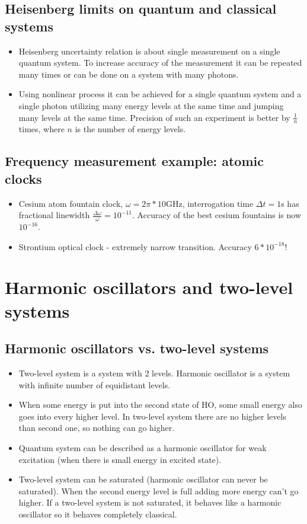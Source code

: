 \documentclass[AtomicOptical1Notes.tex]{subfiles}
\begin{document}
	\subsection{Heisenberg limits on quantum and classical systems}
		\begin{itemize}
			\item Heisenberg uncertainty relation is about single measurement on a single quantum system. To increase accuracy of the measurement it can be repeated many times or can be done on a system with many photons.
			\item Using nonlinear process it can be achieved for a single quantum system and a single photon utilizing many energy levels at the same time and jumping many levels at the same time. Precision of such an experiment is better by $\frac{1}{n}$ times, where $n$ is the number of energy levels.
		\end{itemize}
	\subsection{Frequency measurement example: atomic clocks}
		\begin{itemize}
			\item Cesium atom fountain clock, $\omega=2\pi*10$GHz, interrogation time $\Delta t=1$s has fractional linewidth $\frac{\Delta\omega}{\omega}=10^{-11}$. Accuracy of the best cesium fountains is now $10^{-16}$.
			\item Strontium optical clock - extremely narrow transition. Accuracy $6*10^{-18}$!
		\end{itemize}
		
\section{Harmonic oscillators and two-level systems}
	\subsection{Harmonic oscillators vs. two-level systems}
		\begin{itemize}
			\item Two-level system is a system with 2 levels. Harmonic oscillator is a system with infinite number of equidistant levels. 
			\item When some energy is put into the second state of HO, some small energy also goes into every higher level. In two-level system there are no higher levels than second one, so nothing can go higher.
			\item Quantum system can be described as a harmonic oscillator for weak excitation (when there is small energy in excited state).
			\item Two-level system can be saturated (harmonic oscillator can never be saturated). When the second energy level is full adding more energy can't go higher. If a two-level system is not saturated, it behaves like a harmonic oscillator so it behaves completely classical.
		\end{itemize}
\end{document}
